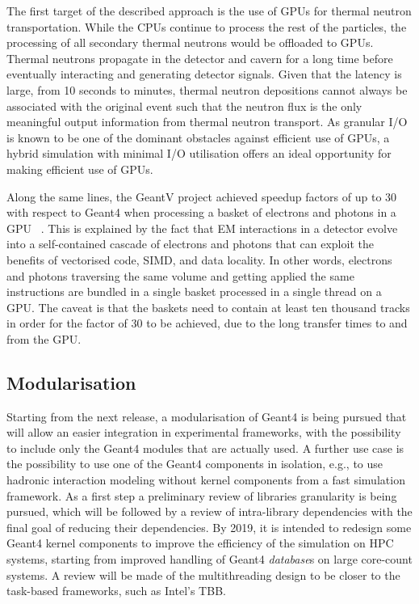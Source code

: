 \documentclass[12pt,a4paper]{article}
\begin{document}
{The first target of the described approach is the use of GPUs for
thermal neutron transportation. While the CPUs continue to process the
rest of the particles, the processing of all secondary thermal neutrons
would be offloaded to GPUs. Thermal neutrons propagate in the detector
and cavern for a long time before eventually interacting and generating
detector signals. Given that the latency is large, from 10 seconds to
minutes, thermal neutron depositions cannot always be associated with
the original event such that the neutron flux is the only meaningful
output information from thermal neutron transport. As granular I/O is
known to be one of the dominant obstacles against efficient use of GPUs,
a hybrid simulation with minimal I/O utilisation offers an ideal
opportunity for making efficient use of GPUs.

Along the same lines, the GeantV project achieved speedup factors of up
to 30 with respect to Geant4 when processing a basket of electrons and
photons in a GPU ~\cite{1742-6596-762-1-012019}. This is explained by the fact that EM
interactions in a detector evolve into a self-contained cascade of
electrons and photons that can exploit the benefits of vectorised code,
SIMD, and data locality. In other words, electrons and photons
traversing the same volume and getting applied the same instructions are
bundled in a single basket processed in a single thread on a GPU. The
caveat is that the baskets need to contain at least ten thousand tracks
in order for the factor of 30 to be achieved, due to the long transfer
times to and from the GPU.

\hypertarget{modularisation}{%
\subsection{Modularisation}\label{modularisation}}

Starting from the next release, a modularisation of Geant4 is being
pursued that will allow an easier integration in experimental
frameworks, with the possibility to include only the Geant4 modules that
are actually used. A further use case is the possibility to use one of
the Geant4 components in isolation, e.g., to use hadronic interaction
modeling without kernel components from a fast simulation framework. As
a first step a preliminary review of libraries granularity is being
pursued, which will be followed by a review of intra-library
dependencies with the final goal of reducing their dependencies. By
2019, it is intended to redesign some Geant4 kernel components to
improve the efficiency of the simulation on HPC systems, starting from
improved handling of Geant4 \emph{database}s on large core-count
systems. A review will be made of the multithreading design to be closer
to the task-based frameworks, such as Intel's TBB.

}
\end{document}

